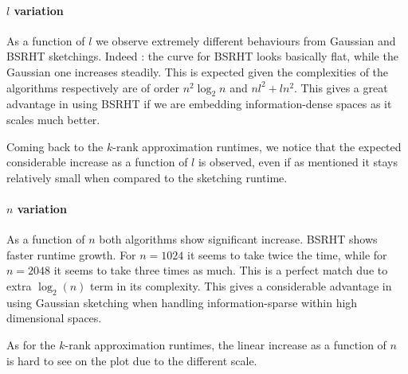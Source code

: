 \documentclass[a4paper, 12pt,oneside]{article}
\begin{document}
		\paragraph{$l$ variation}
		As a function of $l$ we observe extremely different behaviours from Gaussian and BSRHT sketchings. Indeed : the curve for BSRHT looks basically flat, while the Gaussian one increases steadily. This is expected given the complexities of the algorithms respectively are of order $n^2\log_2{n}$ and $nl^2 + ln^2$. This gives a great advantage in using BSRHT if we are embedding information-dense spaces as it scales much better.		

		Coming back to the $k$-rank approximation runtimes, we notice that the expected considerable increase as a function of $l$ is observed, even if as mentioned it stays relatively small when compared to the sketching runtime.
		\paragraph{$n$ variation}
		As a function of $n$ both algorithms show significant increase. BSRHT shows faster runtime growth. For $n=1024$ it seems to take twice the time, while for $n=2048$ it seems to take three times as much. This is a perfect match due to extra $\log_2(n)$ term in its complexity. This gives a considerable advantage in using Gaussian sketching when handling information-sparse within high dimensional spaces.

		As for the $k$-rank approximation runtimes, the linear increase as a function of $n$ is hard to see on the plot due to the different scale. 
\end{document}
